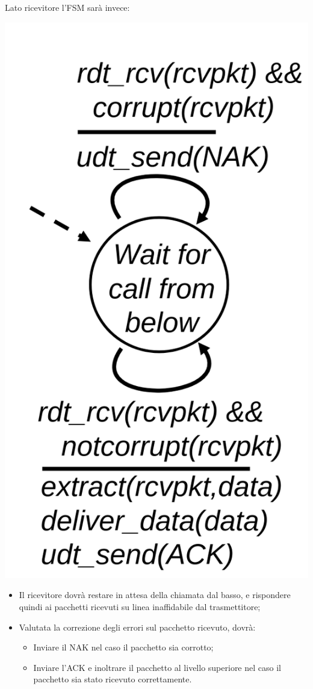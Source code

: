 \documentclass[a4paper,11pt]{article}
\begin{document}
Lato ricevitore l'FSM sarà invece:
\begin{center}
	\includegraphics[scale=0.18]{../figures/rdt2fsm2.png}
\end{center}
\begin{itemize}
	\item Il ricevitore dovrà restare in attesa della chiamata dal basso, e rispondere quindi ai pacchetti ricevuti su linea inaffidabile dal trasmettitore;
	\item Valutata la correzione degli errori sul pacchetto ricevuto, dovrà:
		\begin{itemize}
			\item Inviare il NAK nel caso il pacchetto sia corrotto;
			\item Inviare l'ACK e inoltrare il pacchetto al livello superiore nel caso il pacchetto sia stato ricevuto correttamente.
		\end{itemize}
\end{itemize}
\end{document}

